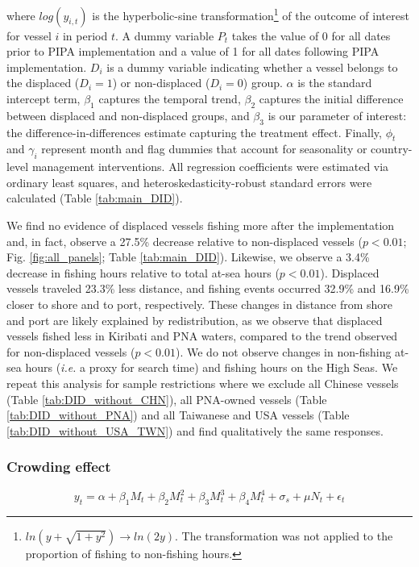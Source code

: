 \documentclass[12pt]{article}
\begin{document}
\noindent where $log(y_{i,t})$ is the hyperbolic-sine transformation\footnote{$ln\left(y + \sqrt{1 + y^2}\right)\rightarrow ln(2y)$. The transformation was not applied to the proportion of fishing to non-fishing hours.} of the outcome of interest for vessel $i$ in period $t$. A dummy variable $P_t$ takes the value of 0 for all dates prior to PIPA implementation and a value of 1 for all dates following PIPA implementation. $D_i$ is a dummy variable indicating whether a vessel belongs to the displaced ($D_i = 1$) or non-displaced ($D_i = 0$) group. $\alpha$ is the standard intercept term, $\beta_1$ captures the temporal trend, $\beta_2$ captures the initial difference between displaced and non-displaced groups, and $\beta_3$ is our parameter of interest: the difference-in-differences estimate capturing the treatment effect. Finally, $\phi_t$ and $\gamma_i$ represent month and flag dummies that account for seasonality or country-level management interventions. All regression coefficients were estimated via ordinary least squares, and heteroskedasticity-robust standard errors were calculated (Table \ref{tab:main_DID}).

We find no evidence of displaced vessels fishing more after the implementation and, in fact, observe a 27.5\% decrease relative to non-displaced vessels ($p < 0.01$; Fig. \ref{fig:all_panels}; Table \ref{tab:main_DID}). Likewise, we observe a 3.4\% decrease in fishing hours relative to total at-sea hours ($p < 0.01$). Displaced vessels traveled 23.3\% less distance, and fishing events occurred 32.9\% and 16.9\% closer to shore and to port, respectively. These changes in distance from shore and port are likely explained by redistribution, as we observe that displaced vessels fished less in Kiribati and PNA waters, compared to the trend observed for non-displaced vessels ($p < 0.01$). We do not observe changes in non-fishing at-sea hours (\emph{i.e.} a proxy for search time) and fishing hours on the High Seas. We repeat this analysis for sample restrictions where we exclude all Chinese vessels (Table \ref{tab:DID_without_CHN}), all PNA-owned vessels (Table \ref{tab:DID_without_PNA}) and all Taiwanese and USA vessels (Table \ref{tab:DID_without_USA_TWN}) and find qualitatively the same responses.

\subsubsection{Crowding effect}

\begin{equation}
y_t = \alpha + \beta_1 M_t + \beta_2 M_t^2 + \beta_3 M_t^3 + \beta_4 M_t ^4 + \sigma_s + \mu N_t + \epsilon_t
\label{eqn:sp_corr}
\end{equation}
\end{document}
